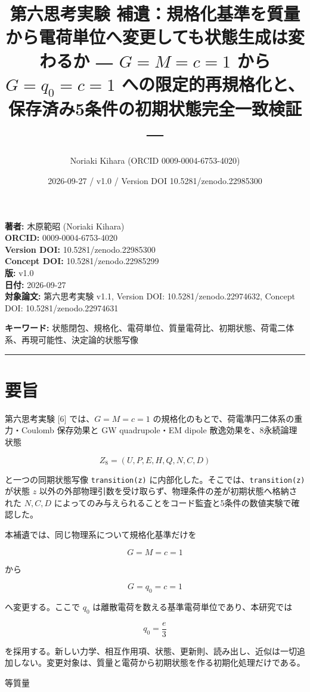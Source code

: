 \documentclass[
  a4paper,
]{ltjsarticle}
\title{第六思考実験
補遺：規格化基準を質量から電荷単位へ変更しても状態生成は変わるか ―
\(G=M=c=1\) から \(G=q_0=c=1\)
への限定的再規格化と、保存済み5条件の初期状態完全一致検証 ―}
\author{Noriaki Kihara (ORCID 0009-0004-6753-4020)}
\date{2026-09-27 / v1.0 / Version DOI 10.5281/zenodo.22985300}
\begin{document}
\maketitle

\textbf{著者:} 木原範昭 (Noriaki Kihara)\\
\textbf{ORCID:} 0009-0004-6753-4020\\
\textbf{Version DOI:} 10.5281/zenodo.22985300\\
\textbf{Concept DOI:} 10.5281/zenodo.22985299\\
\textbf{版:} v1.0\\
\textbf{日付:} 2026-09-27\\
\textbf{対象論文:} 第六思考実験 v1.1, Version DOI:
10.5281/zenodo.22974632, Concept DOI: 10.5281/zenodo.22974631

\textbf{キーワード:}
状態閉包、規格化、電荷単位、質量電荷比、初期状態、荷電二体系、再現可能性、決定論的状態写像

\begin{center}\rule{0.5\linewidth}{0.5pt}\end{center}

\section{要旨}\label{ux8981ux65e8}

第六思考実験 {[}6{]} では、\(G=M=c=1\)
の規格化のもとで、荷電準円二体系の重力・Coulomb 保存効果と GW
quadrupole・EM dipole 散逸効果を、8永続論理状態

\[
Z_8=(U,P,E,H,Q,N,C,D)
\]

と一つの同期状態写像 \texttt{transition(z)}
に内部化した。そこでは、\texttt{transition(z)} が状態 \(z\)
以外の外部物理引数を受け取らず、物理条件の差が初期状態へ格納された
\(N,C,D\)
によってのみ与えられることをコード監査と5条件の数値実験で確認した。

本補遺では、同じ物理系について規格化基準だけを

\[
G=M=c=1
\]

から

\[
\boxed{G=q_0=c=1}
\]

へ変更する。ここで \(q_0\)
は離散電荷を数える基準電荷単位であり、本研究では

\[
q_0=\frac{e}{3}
\]

を採用する。新しい力学、相互作用項、状態、更新則、読み出し、近似は一切追加しない。変更対象は、質量と電荷から初期状態を作る初期化処理だけである。

等質量
\end{document}
